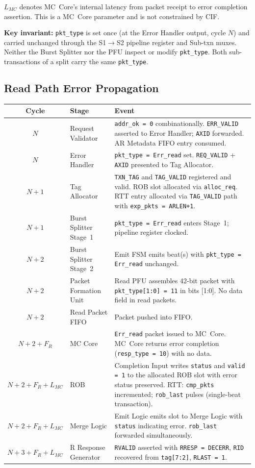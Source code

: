 $L_{MC}$ denotes MC~Core's internal latency from packet receipt to error
completion assertion. This is a MC~Core parameter and is not constrained by
CIF.

\textbf{Key invariant:} \texttt{pkt\_type} is set once (at the Error Handler
output, cycle $N$) and carried unchanged through the S1$\rightarrow$S2 pipeline
register and Sub-txn muxes. Neither the Burst Splitter nor the PFU inspect or
modify \texttt{pkt\_type}. Both sub-transactions of a split carry the same
\texttt{pkt\_type}.

\subsection{Read Path Error Propagation}

\begin{center}
\begin{tabular}{clL{9cm}}
\toprule
\textbf{Cycle} & \textbf{Stage} & \textbf{Event} \\
\midrule
$N$   & Request Validator & \texttt{addr\_ok = 0} combinationally. \texttt{ERR\_VALID} asserted to Error Handler; \texttt{AXID} forwarded. AR Metadata FIFO entry consumed. \\
$N$   & Error Handler     & \texttt{pkt\_type = Err\_read} set. \texttt{REQ\_VALID} + \texttt{AXID} presented to Tag Allocator. \\
$N+1$ & Tag Allocator     & \texttt{TXN\_TAG} and \texttt{TAG\_VALID} registered and valid. ROB slot allocated via \texttt{alloc\_req}. RTT entry allocated via \texttt{TAG\_VALID} path with \texttt{exp\_pkts = ARLEN+1}. \\
$N+1$ & Burst Splitter Stage~1 & \texttt{pkt\_type = Err\_read} enters Stage~1; pipeline register clocked. \\
$N+2$ & Burst Splitter Stage~2 & Emit FSM emits beat(s) with \texttt{pkt\_type = Err\_read} unchanged. \\
$N+2$ & Packet Formation Unit & Read PFU assembles 42-bit packet with \texttt{pkt\_type[1:0] = 11} in bits [1:0]. No data field in read packets. \\
$N+2$ & Read Packet FIFO  & Packet pushed into FIFO. \\
$N+2 + F_R$ & MC Core & \texttt{Err\_read} packet issued to MC~Core. MC~Core returns error completion (\texttt{resp\_type = 10}) with no data. \\
$N+2 + F_R + L_{MC}$ & ROB & Completion Input writes \texttt{status} and \texttt{valid = 1} to the allocated ROB slot with error status preserved. RTT: \texttt{cmp\_pkts} incremented; \texttt{rob\_last} pulses (single-beat transaction). \\
$N+2 + F_R + L_{MC}$ & Merge Logic & Emit Logic emits slot to Merge Logic with \texttt{status} indicating error. \texttt{rob\_last} forwarded simultaneously. \\
$N+3 + F_R + L_{MC}$ & R Response Generator & \texttt{RVALID} asserted with \texttt{RRESP = DECERR}, \texttt{RID} recovered from \texttt{tag[7:2]}, \texttt{RLAST = 1}. \\
\bottomrule
\end{tabular}
\end{center}

